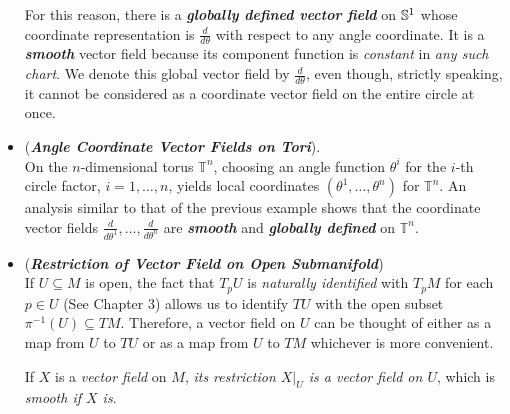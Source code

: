 \documentclass[11pt]{article}
\begin{document}
\begin{itemize}
\begin{example}
For this reason, there is a \emph{\textbf{globally defined vector field}} on ${\mathbb S}^1$ whose coordinate representation is $\frac{d}{d\theta}$  with respect to any angle coordinate. It is a \emph{\textbf{smooth}} vector field because its component function is \emph{constant} in \emph{any such chart}. We denote this global vector field by $\frac{d}{d\theta}$, even though, strictly speaking, it cannot be considered as a coordinate vector field on the entire circle at once.
\end{example}

\item \begin{example} (\emph{\textbf{Angle Coordinate Vector Fields on Tori}}). \\
On the $n$-dimensional torus $\mathbb{T}^n$, choosing an angle function $\theta^i$ for the $i$-th circle factor, $i = 1,\ldots,n$, yields local coordinates $(\theta^1,\ldots,\theta^n)$ for $\mathbb{T}^n$. An analysis similar to that of the previous example shows that the coordinate vector fields $\frac{d}{d\theta^1}, \ldots, \frac{d}{d\theta^n}$ are \emph{\textbf{smooth}} and \emph{\textbf{globally defined}} on $\mathbb{T}^n$.
\end{example}

\item \begin{example} (\emph{\textbf{Restriction of Vector Field on Open Submanifold}}) \\
If $U \subseteq M$ is open, the fact that $T_{p}U$ is \emph{naturally identified} with $T_{p}M$ for each $p \in U$ (See Chapter 3) allows us to identify $TU$ with the open subset $\pi^{-1}(U) \subseteq TM$. Therefore, a vector field on $U$ can be thought of either as a map from $U$ to $TU$ or as a map from $U$ to $TM$ whichever is more convenient.

If $X$ is a \emph{vector field} on $M$, \emph{its restriction $X|_{U}$ is a vector field on $U$}, which is \emph{smooth if $X$ is}.
\end{example}
\end{itemize}
\end{document}
